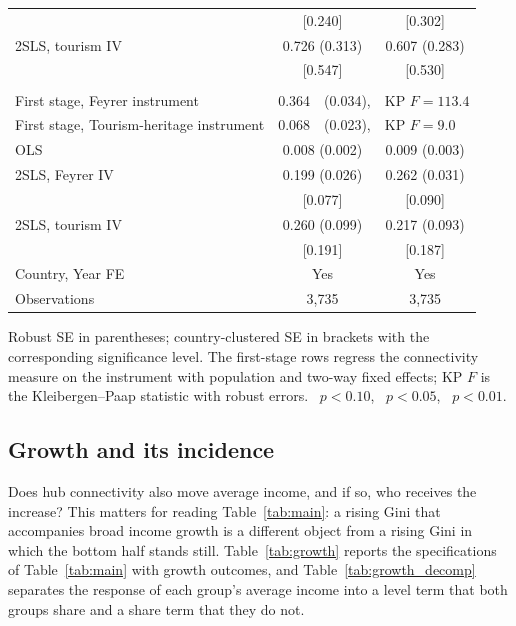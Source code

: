 \begin{table}[H]
\begin{threeparttable}
\begin{tabular}{lcc}
 & [0.240]\sym{**} & [0.302]\sym{***} \\
2SLS, tourism IV & 0.726\sym{**} (0.313) & 0.607\sym{**} (0.283) \\
 & [0.547] & [0.530] \\
\addlinespace
\multicolumn{3}{l}{\emph{Panel C. Total connectivity, $\ln\mathrm{GACI}_{sum}$}}\\
First stage, Feyrer instrument & \multicolumn{2}{l}{0.364\sym{***}\ \ (0.034),\ \ KP $F=113.4$} \\
First stage, Tourism-heritage instrument & \multicolumn{2}{l}{0.068\sym{***}\ \ (0.023),\ \ KP $F=9.0$} \\
OLS & 0.008\sym{***} (0.002) & 0.009\sym{***} (0.003) \\
2SLS, Feyrer IV & 0.199\sym{***} (0.026) & 0.262\sym{***} (0.031) \\
 & [0.077]\sym{***} & [0.090]\sym{***} \\
2SLS, tourism IV & 0.260\sym{***} (0.099) & 0.217\sym{**} (0.093) \\
 & [0.191] & [0.187] \\
\addlinespace
\midrule
Country, Year FE & Yes & Yes \\
Observations & 3,735 & 3,735 \\
\bottomrule
\end{tabular}
\begin{tablenotes}\footnotesize\item Robust SE in parentheses; country-clustered SE in brackets with the corresponding significance level. The first-stage rows regress the connectivity measure on the instrument with population and two-way fixed effects; KP $F$ is the Kleibergen--Paap statistic with robust errors. \sym{*}~$p<0.10$, \sym{**}~$p<0.05$, \sym{***}~$p<0.01$.\end{tablenotes}\end{threeparttable}\end{table}

\subsection{Growth and its incidence}
\label{sec:growth}
Does hub connectivity also move average income, and if so, who receives the increase? This matters for reading Table~\ref{tab:main}: a rising Gini that accompanies broad income growth is a different object from a rising Gini in which the bottom half stands still. Table~\ref{tab:growth} reports the specifications of Table~\ref{tab:main} with growth outcomes, and Table~\ref{tab:growth_decomp} separates the response of each group's average income into a level term that both groups share and a share term that they do not.

